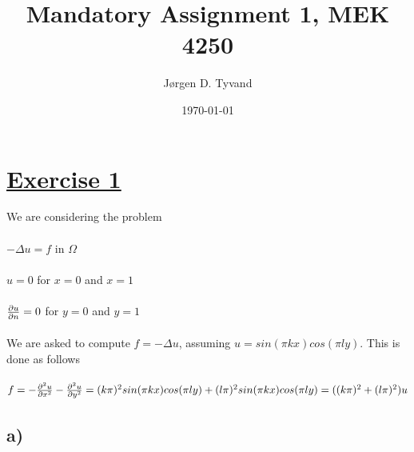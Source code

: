 \documentclass[a4paper,english,12pt,twoside]{article}
\date{\today}
\title{Mandatory Assignment 1, MEK 4250}
\author{Jørgen D. Tyvand}
\begin{document}
\maketitle
\newpage

\section*{\underline{Exercise 1}}

We are considering the problem\\
\\
$-\Delta u = f$ in $\Omega$\\
\\
$u = 0$ for $x = 0$ and $x = 1$\\
\\
$\frac{\partial u}{\partial n} = 0$ for $y = 0$ and $y =1$\\
\\
We are asked to compute $f = -\Delta u$, assuming $u = sin(\pi k x)cos(\pi l y)$. This is done as follows\\
\\
$f = -\frac{\partial^2 u}{\partial x^2} -\frac{\partial^2 u}{\partial y^2} = (k\pi)^2sin(\pi k x)cos(\pi l y) + (l\pi)^2sin(\pi k x)cos(\pi l y)  = ((k\pi)^2 + (l\pi)^2)u$
\subsection*{a)}
\end{document}
